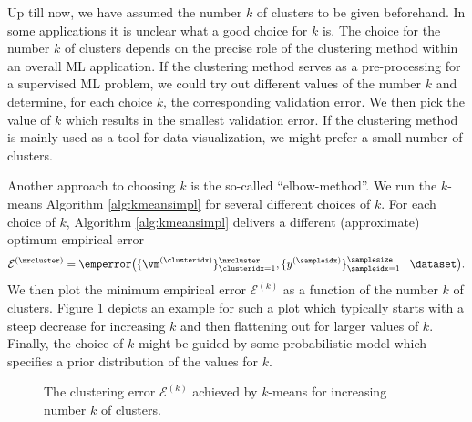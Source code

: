 \documentclass[12pt]{report}
\begin{document}
Up till now, we have assumed the number $k$ of clusters to be given beforehand. 
In some applications it is unclear what a good choice for $k$ is. The choice for the number 
$k$ of clusters depends on the precise role of the clustering method within an overall ML application. 
If the clustering method serves as a pre-processing for a supervised ML problem, we could try out 
different values of the number $k$ and determine, for each choice $k$, the corresponding validation 
error. We then pick the value of $k$ which results in the smallest validation error. If the clustering 
method is mainly used as a tool for data visualization, we might prefer a small number of 
clusters.  


Another approach to choosing $k$ is the so-called ``elbow-method''. We run the $k$-means Algorithm \ref{alg:kmeansimpl} 
for several different choices of $k$. For each choice of $k$, Algorithm \ref{alg:kmeansimpl} delivers a 
different (approximate) optimum empirical error 
$$\mathcal{E}^{(\nrcluster)} = \emperror \big(\{\vm^{(\clusteridx)}\}_{\clusteridx=1}^{\nrcluster},\{y^{(\sampleidx)}\}_{\sampleidx=1}^{\samplesize} \mid \dataset \big).$$ 
We then plot the minimum empirical error $\mathcal{E}^{(k)}$ as a function of the number $k$ of clusters. 
Figure \ref{fig_ellbow} depicts an example for such a plot which typically starts with a steep decrease 
for increasing $k$ and then flattening out for larger values of $k$. Finally, the choice of $k$ might be 
guided by some probabilistic model which specifies a prior distribution of the values for $k$. 


\begin{figure}
\begin{center}
\end{center}
\caption{The clustering error $\mathcal{E}^{(k)}$ achieved by $k$-means for increasing number $k$ of clusters.}
\label{fig_ellbow}
\end{figure}
\end{document}
